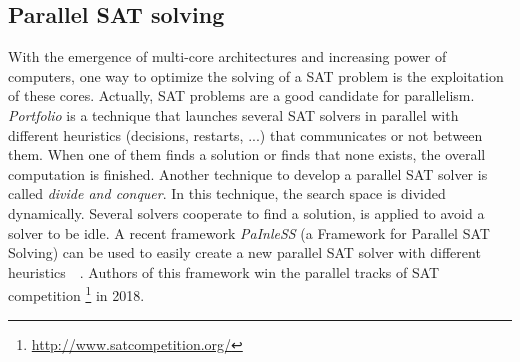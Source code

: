 \subsection{Parallel SAT solving}
With the emergence of multi-core architectures and increasing power of computers, one way to optimize the solving
of a SAT problem is the exploitation of these cores. Actually, SAT problems are a good candidate for parallelism.
\emph{Portfolio} is a technique that launches several SAT solvers in parallel with different heuristics (decisions, restarts, ...) that 
communicates or not between them. When one of them finds a solution or finds that none exists, the overall computation is finished.
Another technique to develop a parallel SAT solver is called \emph{divide and conquer}. In this technique,
the search space is divided  dynamically. Several solvers cooperate to find a solution, 
is applied to avoid a solver to be idle.
A recent framework \emph{PaInleSS} (a Framework for Parallel SAT Solving) can be used to easily create a new parallel 
SAT solver with different heuristics~\cite{le2017painless}~\cite{le2019modular}. Authors of this framework win the parallel 
tracks of SAT competition \footnote{\url{http://www.satcompetition.org/}} in 2018.



%
